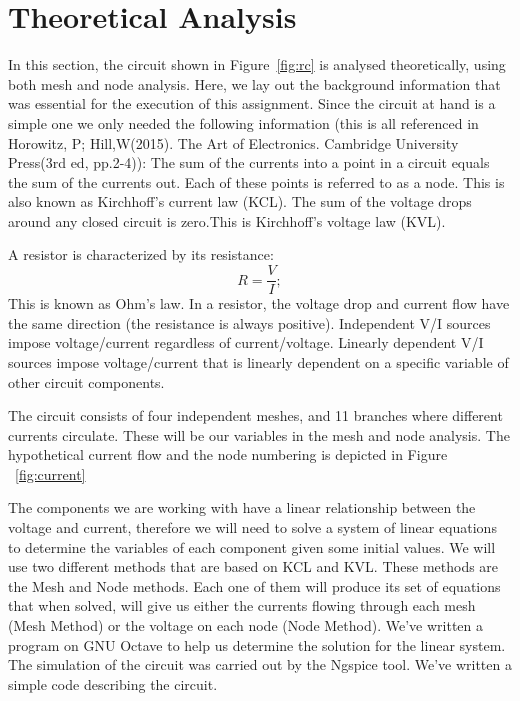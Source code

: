 \section{Theoretical Analysis}
\label{sec:analysis}

In this section, the circuit shown in Figure~\ref{fig:rc} is analysed
theoretically, using both mesh and node analysis.
Here, we lay out the background information that was essential for the execution of this assignment. Since the circuit at hand is a simple one we only needed the following information (this is all referenced in Horowitz, P; Hill,W(2015). The Art of Electronics. Cambridge University Press(3rd ed, pp.2-4)):
The sum of the currents into a point in a circuit equals the sum of the currents out. Each of these points is referred to as a node. This is also known as Kirchhoff’s current law (KCL).
The sum of the voltage drops around any closed circuit is zero.This is Kirchhoff’s voltage law (KVL).

A resistor is characterized by its resistance:
\begin{equation}
  R=\frac {V}{I};
\end{equation}
This is known as Ohm’s law. In a resistor, the voltage drop and current flow have the same direction (the resistance is always positive).
Independent V/I sources impose voltage/current regardless of current/voltage.
Linearly dependent V/I sources impose voltage/current that is linearly dependent on a specific variable of other circuit components.

The circuit consists of four independent meshes, and 11 branches where different currents circulate. These will be our variables in the mesh and node analysis. The hypothetical current flow and the node numbering is depicted in Figure ~\ref{fig:current}


The components we are working with have a linear relationship between the voltage and current, therefore we will need to solve a system of linear equations to determine the variables of each component given some initial values.
We will use two different methods that are based on KCL and KVL. These methods are the Mesh and Node methods. Each one of them will produce its set of equations that when solved, will give us either the currents flowing through each mesh (Mesh Method) or the voltage on each node (Node Method).
We’ve written a program on GNU Octave to help us determine the solution for the linear system. The simulation of the circuit was carried out by the Ngspice tool. We’ve written a simple code describing the circuit.


